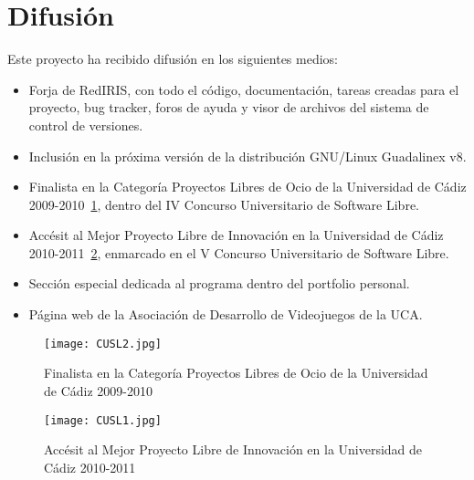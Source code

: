 

\section{Difusión}

Este proyecto ha recibido difusión en los siguientes medios:
\begin{itemize}
    \item Forja de RedIRIS, con todo el código, documentación, tareas creadas para el proyecto, bug tracker, foros de ayuda y
            visor de archivos del sistema de control de versiones.
    \item Inclusión en la próxima versión de la distribución GNU/Linux Guadalinex v8.
    \item Finalista en la Categoría Proyectos Libres de Ocio de la Universidad de Cádiz 2009-2010~\ref{fig:cusl2}, dentro del IV
            Concurso Universitario de Software Libre.
    \item Accésit al Mejor Proyecto Libre de Innovación en la Universidad de Cádiz 2010-2011~\ref{fig:cusl1}, enmarcado en el V
            Concurso Universitario de Software Libre.
    \item Sección especial dedicada al programa dentro del portfolio personal.
    \item Página web de la Asociación de Desarrollo de Videojuegos de la UCA.
\end{itemize}

\begin{figure}[h]
  \begin{center}
    \texttt{[image: CUSL2.jpg]}
  \end{center}
  \caption{Finalista en la Categoría Proyectos Libres de Ocio de la Universidad de Cádiz 2009-2010}
  \label{fig:cusl2}
\end{figure}

\begin{figure}[h]
  \begin{center}
    \texttt{[image: CUSL1.jpg]}
  \end{center}
  \caption{Accésit al Mejor Proyecto Libre de Innovación en la Universidad de Cádiz 2010-2011}
  \label{fig:cusl1}
\end{figure}


